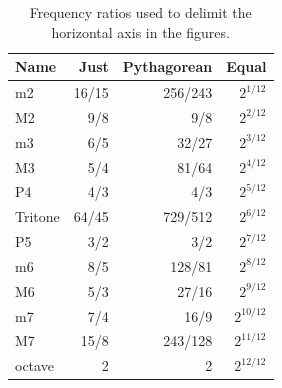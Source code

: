 \begin{table}
  \begin{center}

\begin{tabular}{l|r|r|r}
Name & Just & Pythagorean & Equal\\
\hline
m2 &16/15& 256/243& $2^{1/12}$\\
M2 & 9/8 & 9/8& $2^{2/12}$\\
m3 &6/5 & 32/27& $2^{3/12}$\\
M3 &5/4 & 81/64& $2^{4/12}$\\
P4 &4/3 & 4/3& $2^{5/12}$\\
Tritone &64/45 & 729/512& $2^{6/12}$\\
P5 &3/2 & 3/2 & $2^{7/12}$\\
m6 &8/5&128/81& $2^{8/12}$\\
M6 & 5/3& 27/16 & $2^{9/12}$\\
m7 & 7/4& 16/9 & $2^{10/12}$\\
M7 & 15/8& 243/128 & $2^{11/12}$\\
octave& 2 & 2 & $2^{12/12}$
\end{tabular}
\caption{Frequency ratios used to delimit the horizontal axis in the figures.}
\label{table:ratios}
\end{center}
\end{table}

